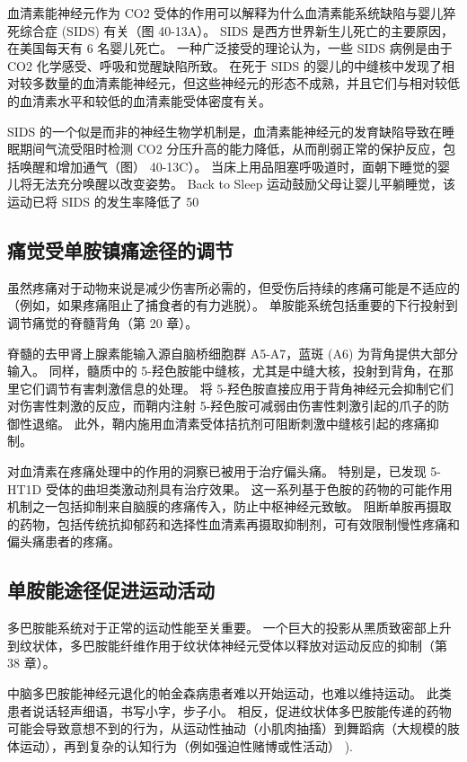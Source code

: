 血清素能神经元作为 CO2 受体的作用可以解释为什么血清素能系统缺陷与婴儿猝死综合症 (SIDS) 有关（图 40-13A）。 SIDS 是西方世界新生儿死亡的主要原因，在美国每天有 6 名婴儿死亡。 一种广泛接受的理论认为，一些 SIDS 病例是由于 CO2 化学感受、呼吸和觉醒缺陷所致。 在死于 SIDS 的婴儿的中缝核中发现了相对较多数量的血清素能神经元，但这些神经元的形态不成熟，并且它们与相对较低的血清素水平和较低的血清素能受体密度有关。

SIDS 的一个似是而非的神经生物学机制是，血清素能神经元的发育缺陷导致在睡眠期间气流受阻时检测 CO2 分压升高的能力降低，从而削弱正常的保护反应，包括唤醒和增加通气（图） 40-13C）。 当床上用品阻塞呼吸道时，面朝下睡觉的婴儿将无法充分唤醒以改变姿势。 Back to Sleep 运动鼓励父母让婴儿平躺睡觉，该运动已将 SIDS 的发生率降低了 50%

\subsection{痛觉受单胺镇痛途径的调节}
虽然疼痛对于动物来说是减少伤害所必需的，但受伤后持续的疼痛可能是不适应的（例如，如果疼痛阻止了捕食者的有力逃脱）。 单胺能系统包括重要的下行投射到调节痛觉的脊髓背角（第 20 章）。

脊髓的去甲肾上腺素能输入源自脑桥细胞群 A5-A7，蓝斑 (A6) 为背角提供大部分输入。 同样，髓质中的 5-羟色胺能中缝核，尤其是中缝大核，投射到背角，在那里它们调节有害刺激信息的处理。 将 5-羟色胺直接应用于背角神经元会抑制它们对伤害性刺激的反应，而鞘内注射 5-羟色胺可减弱由伤害性刺激引起的爪子的防御性退缩。 此外，鞘内施用血清素受体拮抗剂可阻断刺激中缝核引起的疼痛抑制。

对血清素在疼痛处理中的作用的洞察已被用于治疗偏头痛。 特别是，已发现 5-HT1D 受体的曲坦类激动剂具有治疗效果。 这一系列基于色胺的药物的可能作用机制之一包括抑制来自脑膜的疼痛传入，防止中枢神经元致敏。 阻断单胺再摄取的药物，包括传统抗抑郁药和选择性血清素再摄取抑制剂，可有效限制慢性疼痛和偏头痛患者的疼痛。



\subsection{单胺能途径促进运动活动}
多巴胺能系统对于正常的运动性能至关重要。 一个巨大的投影从黑质致密部上升到纹状体，多巴胺能纤维作用于纹状体神经元受体以释放对运动反应的抑制（第 38 章）。

中脑多巴胺能神经元退化的帕金森病患者难以开始运动，也难以维持运动。 此类患者说话轻声细语，书写小字，步子小。 相反，促进纹状体多巴胺能传递的药物可能会导致意想不到的行为，从运动性抽动（小肌肉抽搐）到舞蹈病（大规模的肢体运动），再到复杂的认知行为（例如强迫性赌博或性活动） ).

